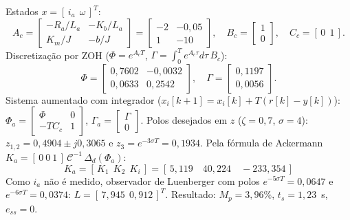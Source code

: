 \documentclass[11pt,a4paper]{article}
\begin{document}
Estados $x=[\,i_a\ \ \omega\,]^T$:
\begin{equation}
A_c=\begin{bmatrix}-R_a/L_a & -K_b/L_a\\ K_m/J & -b/J\end{bmatrix}
   =\begin{bmatrix}-2 & -0{,}05\\ 1 & -10\end{bmatrix},\quad
B_c=\begin{bmatrix}1\\0\end{bmatrix},\quad C_c=[\,0\ \ 1\,].
\end{equation}
Discretiza\c{c}\~ao por ZOH ($\Phi=e^{A_cT}$, $\Gamma=\int_0^T e^{A_c\tau}d\tau\,B_c$):
\begin{equation}
\Phi=\begin{bmatrix}0{,}7602 & -0{,}0032\\ 0{,}0633 & 0{,}2542\end{bmatrix},\quad
\Gamma=\begin{bmatrix}0{,}1197\\ 0{,}0056\end{bmatrix}.
\end{equation}
Sistema aumentado com integrador ($x_i[k+1]=x_i[k]+T(r[k]-y[k])$):
$\Phi_a=\left[\begin{smallmatrix}\Phi & 0\\ -T C_c & 1\end{smallmatrix}\right]$,
$\Gamma_a=\left[\begin{smallmatrix}\Gamma\\0\end{smallmatrix}\right]$.
Polos desejados em $z$ ($\zeta=0{,}7$, $\sigma=4$): $z_{1,2}=0{,}4904\pm j0{,}3065$ e
$z_3=e^{-3\sigma T}=0{,}1934$. Pela f\'ormula de Ackermann
$K_a=[\,0\ 0\ 1\,]\,\mathcal{C}^{-1}\,\Delta_d(\Phi_a)$:
\begin{equation}
\boxed{\,K_{a}=[\,K_1\ \ K_2\ \ K_i\,]=[\,5{,}119\quad 40{,}224\quad -233{,}354\,]\,}
\end{equation}
Como $i_a$ n\~ao \'e medido, observador de Luenberger com polos $e^{-5\sigma T}=0{,}0647$ e
$e^{-6\sigma T}=0{,}0374$: $L=[\,7{,}945\ \ 0{,}912\,]^T$.
Resultado: $M_p=3{,}96\%$, $t_s=1{,}23$~s, $e_{ss}=0$.
\end{document}
